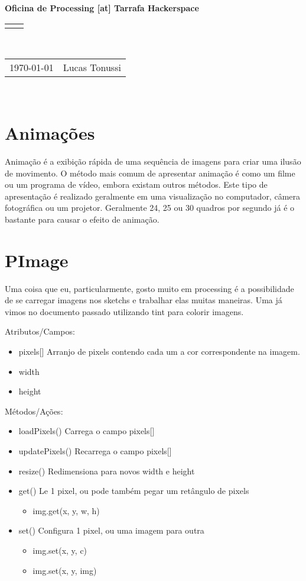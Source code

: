 \documentclass[12pt]{article}
\renewcommand{\title}[1]{\textbf{#1}\\}
\renewcommand{\line}{\begin{tabularx}{\textwidth}{X>{\raggedleft}X}\hline\\\end{tabularx}\\[-0.5cm]}
\newcommand{\leftright}[2]{\begin{tabularx}{\textwidth}{X>{\raggedleft}X}#1%
& #2\\\end{tabularx}\\[-0.5cm]}
\begin{document}
\title{Oficina de Processing [at] Tarrafa Hackerspace}
\line
\leftright{\today}{Lucas Tonussi}

\section{Animações}

\qquad Animação é a exibição rápida de uma sequência de imagens para criar uma ilusão de movimento. O método mais comum de apresentar animação é como um filme ou um programa de vídeo, embora existam outros métodos. Este tipo de apresentação é realizado geralmente em uma visualização no computador, câmera fotográfica ou um projetor. Geralmente 24, 25 ou 30 quadros por segundo já é o bastante para causar o efeito de animação.

\section{PImage}

\qquad Uma coisa que eu, particularmente, gosto muito em processing é a possibilidade de se carregar imagens nos sketchs e trabalhar elas muitas maneiras. Uma já vimos no documento passado utilizando tint para colorir imagens.

Atributos/Campos:

\begin{itemize}
\item pixels[] 	Arranjo de pixels contendo cada um a cor correspondente na imagem.
\item width
\item height
\end{itemize}

Métodos/Ações: 
\begin{itemize}
\item loadPixels() 	Carrega o campo pixels[]
\item updatePixels() 	Recarrega o campo pixels[]
\item resize() Redimensiona para novos width e height
\item get() Le 1 pixel, ou pode também pegar um retângulo de pixels
\begin{itemize}
\item img.get(x, y, w, h)
\end{itemize}
\item set() Configura 1 pixel, ou uma imagem para outra
\begin{itemize}
\item img.set(x, y, c) 
\item img.set(x, y, img) 
\end{itemize}
\end{itemize}
\end{document}
